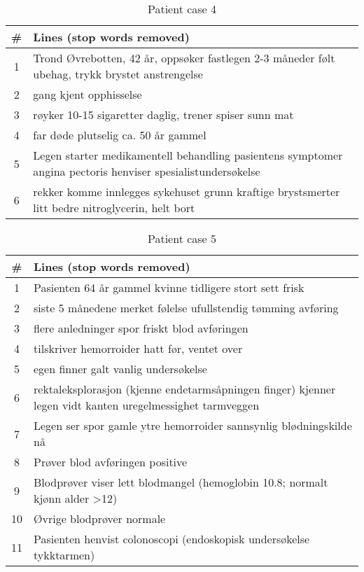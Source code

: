 \begin{table}[htbp] \footnotesize \center
\caption{Patient case 4\label{tab:pcase4}}
\begin{tabularx}{\textwidth}{c X}
    \toprule
    \# & Lines (stop words removed) \\
    \midrule
	1 & Trond Øvrebotten, 42 år, oppsøker fastlegen 2-3 måneder følt ubehag, trykk brystet anstrengelse \\
	2 & gang kjent opphisselse \\
	3 & røyker 10-15 sigaretter daglig, trener spiser sunn mat \\
	4 & far døde plutselig ca. 50 år gammel \\
	5 & Legen starter medikamentell behandling pasientens symptomer angina pectoris henviser spesialistundersøkelse \\
	6 & rekker komme innlegges sykehuset grunn kraftige brystsmerter litt bedre nitroglycerin, helt bort \\
	\bottomrule
\end{tabularx}
\end{table}


\begin{table}[htbp] \footnotesize \center
\caption{Patient case 5\label{tab:pcase5}}
\begin{tabularx}{\textwidth}{c X}
    \toprule
    \# & Lines (stop words removed) \\
    \midrule
	1 & Pasienten 64 år gammel kvinne tidligere stort sett frisk \\
	2 & siste 5 månedene merket følelse ufullstendig tømming avføring \\
	3 & flere anledninger spor friskt blod avføringen \\
	4 & tilskriver hemorroider hatt før, ventet over \\
	5 & egen finner galt vanlig undersøkelse \\
	6 & rektaleksplorasjon (kjenne endetarmsåpningen finger) kjenner legen vidt kanten uregelmessighet tarmveggen \\
	7 & Legen ser spor gamle ytre hemorroider sannsynlig blødningskilde nå \\
	8 & Prøver blod avføringen positive \\
	9 & Blodprøver viser lett blodmangel (hemoglobin 10.8; normalt kjønn alder >12) \\
	10 & Øvrige blodprøver normale \\
	11 & Pasienten henvist colonoscopi (endoskopisk undersøkelse tykktarmen) \\
	\bottomrule
\end{tabularx}
\end{table}


